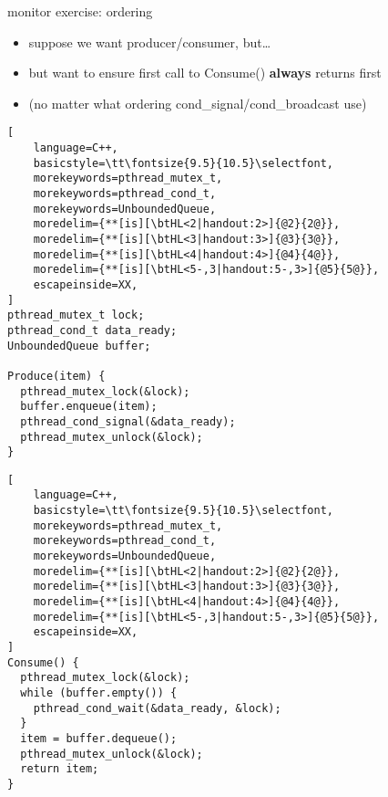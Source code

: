 \begin{frame}[fragile,label=monitorOrderExercise]{monitor exercise: ordering}
\begin{itemize}
\item suppose we want producer/consumer, but\ldots
\item but want to ensure first call to Consume() \textbf{always} returns first
\item (no matter what ordering cond\_signal/cond\_broadcast use)
\end{itemize}
\begin{minipage}{0.45\textwidth}
\begin{lstlisting}[
    language=C++,
    basicstyle=\tt\fontsize{9.5}{10.5}\selectfont,
    morekeywords=pthread_mutex_t,
    morekeywords=pthread_cond_t,
    morekeywords=UnboundedQueue,
    moredelim={**[is][\btHL<2|handout:2>]{@2}{2@}}, 
    moredelim={**[is][\btHL<3|handout:3>]{@3}{3@}}, 
    moredelim={**[is][\btHL<4|handout:4>]{@4}{4@}}, 
    moredelim={**[is][\btHL<5-,3|handout:5-,3>]{@5}{5@}}, 
    escapeinside=XX,
]
pthread_mutex_t lock;
pthread_cond_t data_ready;
UnboundedQueue buffer;

Produce(item) {
  pthread_mutex_lock(&lock);
  buffer.enqueue(item);
  pthread_cond_signal(&data_ready);
  pthread_mutex_unlock(&lock);
}
\end{lstlisting}
\end{minipage}
\begin{minipage}{0.45\textwidth}
\begin{lstlisting}[
    language=C++,
    basicstyle=\tt\fontsize{9.5}{10.5}\selectfont,
    morekeywords=pthread_mutex_t,
    morekeywords=pthread_cond_t,
    morekeywords=UnboundedQueue,
    moredelim={**[is][\btHL<2|handout:2>]{@2}{2@}}, 
    moredelim={**[is][\btHL<3|handout:3>]{@3}{3@}}, 
    moredelim={**[is][\btHL<4|handout:4>]{@4}{4@}}, 
    moredelim={**[is][\btHL<5-,3|handout:5-,3>]{@5}{5@}}, 
    escapeinside=XX,
]
Consume() {
  pthread_mutex_lock(&lock);
  while (buffer.empty()) {
    pthread_cond_wait(&data_ready, &lock);
  }
  item = buffer.dequeue();
  pthread_mutex_unlock(&lock);
  return item;
}
\end{lstlisting}
\end{minipage}
\end{frame}

